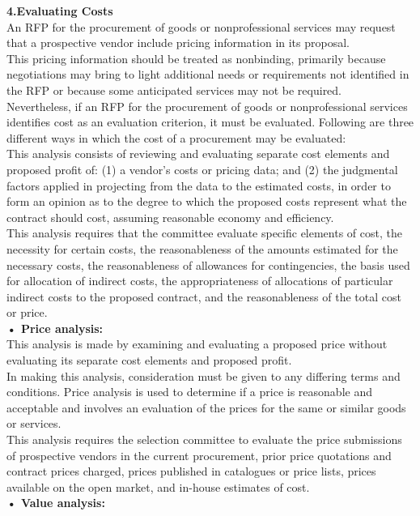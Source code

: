 \documentclass[12pt]{article}
\begin{document}
\textbf{4.Evaluating Costs}
\\An RFP for the procurement of goods or nonprofessional services may request
that a prospective vendor include pricing information in its proposal. \\This pricing
information should be treated as nonbinding, primarily because negotiations may
bring to light additional needs or requirements not identified in the RFP or
because some anticipated services may not be required.
\\Nevertheless, if an RFP for the procurement of goods or nonprofessional
services identifies cost as an evaluation criterion, it must be evaluated.
Following are three different ways in which the cost of a procurement may be
evaluated: \\
This analysis consists of reviewing and evaluating separate
cost elements and proposed profit of: (1) a vendor’s costs or pricing data;
and (2) the judgmental factors applied in projecting from the data to the
estimated costs, in order to form an opinion as to the degree to which the
proposed costs represent what the contract should cost, assuming
reasonable economy and efficiency.
\\This analysis requires that the committee evaluate specific elements of cost, the necessity for certain
costs, the reasonableness of the amounts estimated for the necessary
costs, the reasonableness of allowances for contingencies, the basis used
for allocation of indirect costs, the appropriateness of allocations of
particular indirect costs to the proposed contract, and the reasonableness
of the total cost or price.\\
\textbf{• Price analysis:}
\\ This analysis is made by examining and evaluating a
proposed price without evaluating its separate cost elements and
proposed profit.\\ In making this analysis, consideration must be given to
any differing terms and conditions. Price analysis is used to determine if a
price is reasonable and acceptable and involves an evaluation of the
prices for the same or similar goods or services. \\This analysis requires the
selection committee to evaluate the price submissions of prospective
vendors in the current procurement, prior price quotations and contract
prices charged, prices published in catalogues or price lists, prices
available on the open market, and in-house estimates of cost.\\
\textbf{• Value analysis:} 
\end{document}
